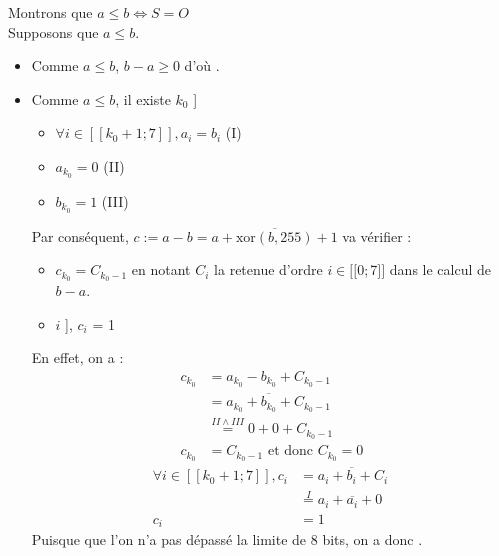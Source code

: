 \documentclass[twoside, 12pt, a4paper]{article}
\begin{document}
        Montrons que $a \leq b \iff S = O$ \\
        \framebox[1cm][c]{\implies} Supposons que $a \leq b$.
        \begin{itemize}
            \item Comme $a \leq b$, $b-a \geq 0$ d'où .
            \item Comme $a \leq b$, il existe $k_0$ \in [\![ $0$ ; $7$ ]\!] 
                \begin{itemize}
                    \item $\forall i \in [\![k_0+1 ; 7]\!], a_i = b_i$ (I)
                    \item $a_{k_0} = 0$ (II)
                    \item $b_{k_0} = 1$ (III)
                \end{itemize}
                Par conséquent, $c := a-b = a + \overline{\text{xor}(b, 255)} + 1$ va vérifier :
                \begin{itemize}
                    \item $c_{k_0} = C_{k_0-1}$ en notant $C_i$ la retenue d'ordre $i \in [\![ $0$ ; $7$ ]\!]$ dans le calcul de $b-a$. \\
                    \item \forall $i$ \in [\![$k_0+1$ ; $7$]\!], $c_i$ = 1
                \end{itemize}
                En effet, on a :
                \begin{align*}
                    c_{k_0} &= a_{k_0} - b_{k_0} + C_{k_0-1} 
                    \\ &= a_{k_0} + \overline{b_{k_0}} + C_{k_0-1} 
                    \\ &\overset{II \land III}{=} 0 + 0 + C_{k_0-1} 
                    \\ c_{k_0} &= C_{k_0-1} \text{ et donc } C_{k_0} = 0
                    \end{align*}
                    \begin{align*}
                    \forall i \in [\![k_0+1 ; 7]\!], c_i &= a_i + \overline{b_i} + C_i \
                    \\ &\overset{I}{=} a_i + \overline{a_i} + 0 
                    \\ c_i &= 1
                    \end{align*}
                Puisque que l'on n'a pas dépassé la limite de 8 bits, on a donc .
                
        \end{itemize}
        
\end{document}
